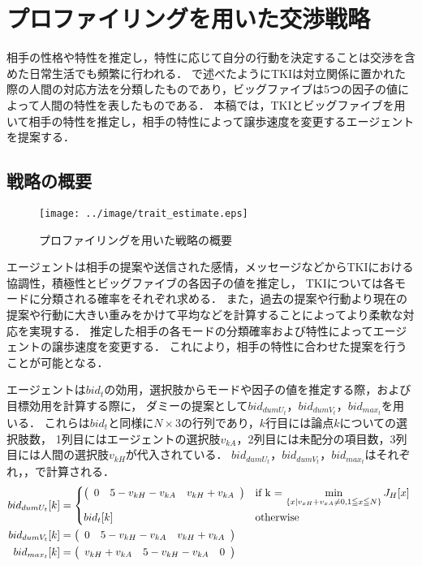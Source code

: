 

\chapter{プロファイリングを用いた交渉戦略}
相手の性格や特性を推定し，特性に応じて自分の行動を決定することは交渉を含めた日常生活でも頻繁に行われる．
で述べたようにTKIは対立関係に置かれた際の人間の対応方法を分類したものであり，ビッグファイブは5つの因子の値によって人間の特性を表したものである．
本稿では，TKIとビッグファイブを用いて相手の特性を推定し，相手の特性によって譲歩速度を変更するエージェントを提案する．

\section{戦略の概要}
\begin{figure}[tb]
    \centering
    \texttt{[image: ../image/trait\_estimate.eps]}
    \caption{プロファイリングを用いた戦略の概要}
    \label{fig:trait_estimate}
\end{figure}
エージェントは相手の提案や送信された感情，メッセージなどからTKIにおける協調性，積極性とビッグファイブの各因子の値を推定し，
TKIについては各モードに分類される確率をそれぞれ求める．
また，過去の提案や行動より現在の提案や行動に大きい重みをかけて平均などを計算することによってより柔軟な対応を実現する．
推定した相手の各モードの分類確率および特性によってエージェントの譲歩速度を変更する．
これにより，相手の特性に合わせた提案を行うことが可能となる．

エージェントは$bid_t$の効用，選択肢からモードや因子の値を推定する際，および目標効用を計算する際に，
ダミーの提案として$bid_{dumU_t}$，$bid_{dumV_t}$，$bid_{max_t}$を用いる．
これらは$bid_t$と同様に$N \times 3$の行列であり，$k$行目には論点$k$についての選択肢数，
1列目にはエージェントの選択肢$v_{kA}$，2列目には未配分の項目数，3列目には人間の選択肢$v_{kH}$が代入されている．
$bid_{dumU_t}$，$bid_{dumV_t}$，$bid_{max_t}$はそれぞれ，，で計算される．
\begin{align}
    bid_{dumU_t}[k] &= 
    \begin{cases*}
        \left(
    \begin{array}{rrr}
        0 & 5 - v_{kH} - v_{kA} & v_{kH} + v_{kA}
    \end{array}
    \right) & if k = $\displaystyle \min_{\{x | v_{xH} + v_{xA} \neq 0, 1 \leqq x \leqq N \} } J_H[x]$ \\
        bid_t[k] & otherwise
    \end{cases*}
    \label{eq:dummyutil} \\
    bid_{dumV_t}[k] &= 
        \left(
    \begin{array}{rrr}
        0 & 5 - v_{kH} - v_{kA} & v_{kH} + v_{kA}
    \end{array}
    \right)
    \label{eq:dummyvalue} \\
    bid_{max_t}[k] &= 
        \left(
    \begin{array}{rrr}
        v_{kH} + v_{kA} & 5 - v_{kH} - v_{kA} & 0
    \end{array}
    \right)
    \label{eq:maxutil} 
\end{align}

